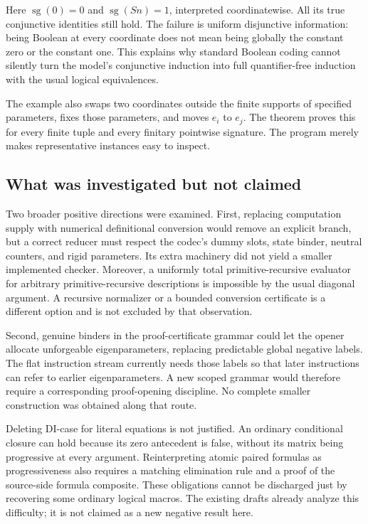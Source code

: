 \documentclass[11pt,letterpaper]{article}
\theoremstyle{definition}\newtheorem{definition}[theorem]{Definition}
\theoremstyle{remark}\newtheorem{remark}[theorem]{Remark}
\begin{document}
Here $\operatorname{sg}(0)=0$ and $\operatorname{sg}(Sn)=1$,
interpreted coordinatewise. All its true conjunctive identities still
hold. The failure is uniform disjunctive information: being Boolean
at every coordinate does not mean being globally the constant zero
or the constant one. This explains why standard Boolean coding cannot
silently turn the model's conjunctive induction into full quantifier-free
induction with the usual logical equivalences.

The example also swaps two coordinates outside the finite supports of
specified parameters, fixes those parameters, and moves $e_i$ to $e_j$.
The theorem proves this for every finite tuple and every finitary
pointwise signature. The program merely makes representative instances
easy to inspect.

\subsection{What was investigated but not claimed}

Two broader positive directions were examined. First, replacing
computation supply with numerical definitional conversion would remove
an explicit branch, but a correct reducer must respect the codec's
dummy slots, state binder, neutral counters, and rigid parameters. Its
extra machinery did not yield a smaller implemented checker. Moreover,
a uniformly total primitive-recursive evaluator for arbitrary
primitive-recursive descriptions is impossible by the usual diagonal
argument. A recursive normalizer or a bounded conversion certificate
is a different option and is not excluded by that observation.

Second, genuine binders in the proof-certificate grammar could let the
opener allocate unforgeable eigenparameters, replacing predictable
global negative labels. The flat instruction stream currently needs
those labels so that later instructions can refer to earlier
eigenparameters. A new scoped grammar would therefore require a
corresponding proof-opening discipline. No complete smaller construction
was obtained along that route.

Deleting DI-case for literal equations is not justified. An ordinary
conditional closure can hold because its zero antecedent is false,
without its matrix being progressive at every argument. Reinterpreting
atomic paired formulas as progressiveness also requires a matching
elimination rule and a proof of the source-side formula composite.
These obligations cannot be discharged just by recovering some ordinary
logical macros. The existing drafts already analyze this difficulty;
it is not claimed as a new negative result here.
\end{document}

